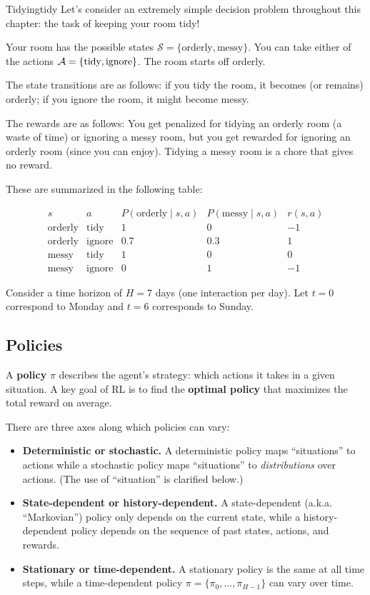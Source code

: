 \documentclass[../main/main]{subfiles}
\begin{document}
\begin{example}{Tidying}{tidy}
    Let's consider an extremely simple decision problem throughout this chapter: the task of keeping your room tidy!

    Your room has the possible states $\mathcal{S} = \{ \text{orderly}, \text{messy} \}$. You can take either of the actions $\mathcal{A} = \{ \text{tidy}, \text{ignore} \}$. The room starts off orderly.
    
    The state transitions are as follows: if you tidy the room, it becomes (or remains) orderly; if you ignore the room, it might become messy.
    
    The rewards are as follows: You get penalized for tidying an orderly room (a waste of time) or ignoring a messy room, but you get rewarded for ignoring an orderly room (since you can enjoy). Tidying a messy room is a chore that gives no reward.
    
    These are summarized in the following table:

    \[
    \begin{array}{ccccc}
        s & a & P(\text{orderly} \mid s, a) & P(\text{messy} \mid s, a) & r(s, a) \\
        \text{orderly} & \text{tidy} & 1 & 0 & -1 \\
        \text{orderly} & \text{ignore} & 0.7 & 0.3 & 1 \\
        \text{messy} & \text{tidy} & 1 & 0 & 0 \\
        \text{messy} & \text{ignore} & 0 & 1 & -1
    \end{array}
    \]

    Consider a time horizon of $H = 7$ days (one interaction per day). Let $t = 0$ correspond to Monday and $t = 6$ corresponds to Sunday.
\end{example}

\subsection{Policies}

A \textbf{policy} $\pi$ describes the agent's strategy: which actions it takes in a given situation. A key goal of RL is to find the \textbf{optimal policy} that maximizes the total reward on average.

There are three axes along which policies can vary:

\begin{itemize}
    \item \textbf{Deterministic or stochastic.} A deterministic policy maps ``situations'' to actions while a stochastic policy maps ``situations'' to \emph{distributions} over actions. (The use of ``situation'' is clarified below.)
    \item \textbf{State-dependent or history-dependent.} A state-dependent (a.k.a. ``Markovian'') policy only depends on the current state, while a history-dependent policy depends on the sequence of past states, actions, and rewards.
    \item \textbf{Stationary or time-dependent.} A stationary policy is the same at all time steps, while a time-dependent policy $\pi = \{ \pi_0, \dots, \pi_{H-1} \}$ can vary over time.
\end{itemize}
\end{document}
